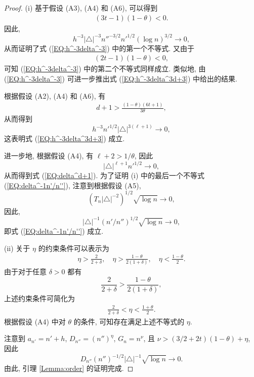 \documentclass[a4paper,openay,14pt]{ctexbook}
\numberwithin{equation}{section}
\numberwithin{lem}{section}
\begin{document}
\begin{proof}
(i) 基于假设 (A3), (A4) 和 (A6), 可以得到
\begin{align*}
  (3t-1)(1-\theta)<0.  
\end{align*}
因此,
\[
h^{-3}\vert \triangle \vert^{-3} n''^{-3/2} n'^{1/2}\left(\log n \right)^{3/2} \to 0,
\]
从而证明了式 (\ref{EQ:h^-3delta^-3}) 中的第一个不等式. 又由于
\begin{align*}
    (2t-1)(1-\theta)<0,
\end{align*}
可知 (\ref{EQ:h^-3delta^-3}) 中的第二个不等式同样成立. 类似地, 由 (\ref{EQ:h^-3delta^-3}) 可进一步推出式 (\ref{EQ:h^-3delta^3d+3}) 中给出的结果.

根据假设 (A2), (A4) 和 (A6), 有
\begin{align*}
    d+1>\frac{(1-\theta)(6t+1)}{3\theta},
\end{align*}
从而得到
\[
h^{-3}n'^{1/2}\vert \triangle \vert^{3(\ell+1)}\to 0,
\]
这表明式 (\ref{EQ:h^-3delta^3d+3}) 成立.

进一步地, 根据假设 (A4), 有 $\ell+2 > 1/\theta$, 因此
\[
\vert\triangle \vert^{\ell+1} n'^{1/2} \to 0,
\]
从而得到式 (\ref{EQ:delta^d+1}). 为了证明 (i) 中的最后一个不等式 (\ref{EQ:delta^-1n'/n''}), 注意到根据假设 (A5),
\[
\left(T_n \vert \triangle \vert^{-2}\right)^{1/2} \sqrt{\log n} \to 0,
\]
因此,
\[
\vert\triangle\vert^{-1} \left(n'/n''\right)^{1/2}\sqrt{\log n}\to 0,
\]
即式 (\ref{EQ:delta^-1n'/n''}) 成立.

(ii) 关于 $\eta$ 的约束条件可以表示为
\begin{align*}
    \eta > \frac{2}{2+\delta}, \quad \eta>\frac{1-\theta}{2(1+\delta)}, \quad \eta < \frac{1-\theta}{2}.
\end{align*}
由于对于任意 $\delta>0$ 都有
\[
\frac{2}{2+\delta}>\frac{1-\theta}{2(1+\delta)},
\]
上述约束条件可简化为
\begin{align*}
  \frac{2}{2+\delta}<\eta<\frac{1+\theta}{2}. 
\end{align*}
根据假设 (A4) 中对 $\theta$ 的条件, 可知存在满足上述不等式的 $\eta$.

注意到 $a_{n'}=n'+h$, $D_{n''}=(n'')^{\eta}$, $G_n=n^{\nu}$, 且 $\nu>(3/2+2t)(1-\theta)+\eta$, 因此
\[
D_{n''}(n'')^{-1/2}\vert\triangle\vert^{-1}\sqrt{\log n} \to 0.
\]
由此, 引理 \ref{Lemma:order} 的证明完成.
\end{proof}
\end{document}
